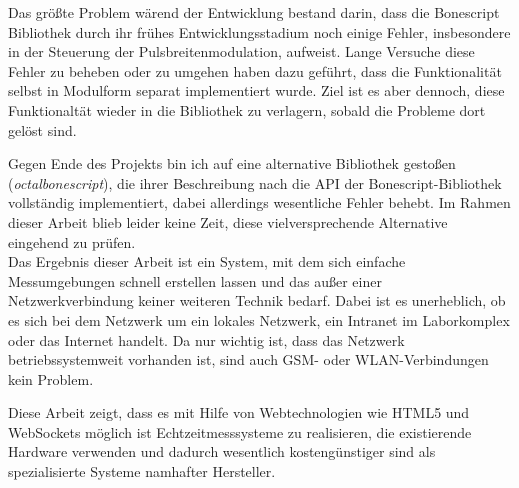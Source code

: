\documentclass[thesis.tex]{subfiles}
\begin{document}
Das größte Problem wärend der Entwicklung bestand darin, dass die Bonescript Bibliothek durch ihr frühes Entwicklungsstadium noch einige Fehler, insbesondere in der Steuerung der Pulsbreitenmodulation, aufweist. Lange Versuche diese Fehler zu beheben oder zu umgehen haben dazu geführt, dass die Funktionalität selbst in Modulform separat implementiert wurde. Ziel ist es aber dennoch, diese Funktionaltät wieder in die Bibliothek zu verlagern, sobald die Probleme dort gelöst sind. 

Gegen Ende des Projekts bin ich auf eine alternative Bibliothek gestoßen (\textit{octalbonescript}), die ihrer Beschreibung nach die API der Bonescript-Bibliothek vollständig implementiert, dabei allerdings wesentliche Fehler behebt. Im Rahmen dieser Arbeit blieb leider keine Zeit, diese vielversprechende Alternative eingehend zu prüfen.\\

Das Ergebnis dieser Arbeit ist ein System, mit dem sich einfache Messumgebungen schnell erstellen lassen und das außer einer Netzwerkverbindung keiner weiteren Technik bedarf. Dabei ist es unerheblich, ob es sich bei dem Netzwerk um ein lokales Netzwerk, ein Intranet im Laborkomplex oder das Internet handelt. Da nur wichtig ist, dass das Netzwerk betriebssystemweit vorhanden ist, sind auch GSM- oder WLAN-Verbindungen kein Problem.

Diese Arbeit zeigt, dass es mit Hilfe von Webtechnologien wie HTML5 und WebSockets möglich ist Echtzeitmesssysteme zu realisieren, die existierende Hardware verwenden und dadurch wesentlich kostengünstiger sind als spezialisierte Systeme namhafter Hersteller.
\end{document}
